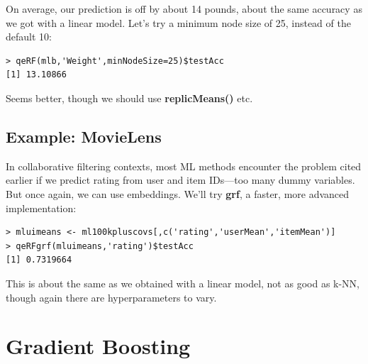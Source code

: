 On average, our prediction is off by about 14 pounds, about the same
accuracy as we got with a linear model.  Let's try a minimum node size
of 25, instead of the default 10:

\begin{lstlisting}
> qeRF(mlb,'Weight',minNodeSize=25)$testAcc
[1] 13.10866
\end{lstlisting}

Seems better, though we should use \textbf{replicMeans()} etc.

\subsection{Example:  MovieLens}

In collaborative filtering contexts, most ML methods encounter the 
problem cited earlier if we predict rating from user and item IDs---too 
many dummy variables.  But once again, we can use embeddings.  We'll try
\textbf{grf}, a faster, more advanced implementation:

\begin{lstlisting}
> mluimeans <- ml100kpluscovs[,c('rating','userMean','itemMean')]
> qeRFgrf(mluimeans,'rating')$testAcc
[1] 0.7319664
\end{lstlisting}

This is about the same as we obtained with a linear model, not as good
as k-NN, though again there are hyperparameters to vary.

\section{Gradient Boosting}
